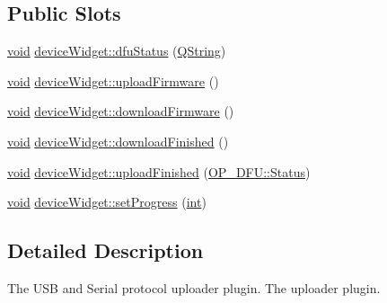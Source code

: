 \subsection*{Public Slots}
\begin{DoxyCompactItemize}
\item 
\hyperlink{group___u_a_v_objects_plugin_ga444cf2ff3f0ecbe028adce838d373f5c}{void} \hyperlink{group___uploader_gac421d53cac355c47f763a62eab7675c1}{device\-Widget\-::dfu\-Status} (\hyperlink{group___u_a_v_objects_plugin_gab9d252f49c333c94a72f97ce3105a32d}{Q\-String})
\item 
\hyperlink{group___u_a_v_objects_plugin_ga444cf2ff3f0ecbe028adce838d373f5c}{void} \hyperlink{group___uploader_ga51b53782cd70711b9ca91f81ef02565b}{device\-Widget\-::upload\-Firmware} ()
\item 
\hyperlink{group___u_a_v_objects_plugin_ga444cf2ff3f0ecbe028adce838d373f5c}{void} \hyperlink{group___uploader_ga988f01d143265ee96b4255b07b63fbf6}{device\-Widget\-::download\-Firmware} ()
\item 
\hyperlink{group___u_a_v_objects_plugin_ga444cf2ff3f0ecbe028adce838d373f5c}{void} \hyperlink{group___uploader_ga0809fb3c0a799a12c92704a36d3abf16}{device\-Widget\-::download\-Finished} ()
\item 
\hyperlink{group___u_a_v_objects_plugin_ga444cf2ff3f0ecbe028adce838d373f5c}{void} \hyperlink{group___uploader_ga671fb25fd918e7eeac5c16bd1f1dfe86}{device\-Widget\-::upload\-Finished} (\hyperlink{class_o_p___d_f_u_a83b075feaf572fe76e597acea58c8eda}{O\-P\-\_\-\-D\-F\-U\-::\-Status})
\item 
\hyperlink{group___u_a_v_objects_plugin_ga444cf2ff3f0ecbe028adce838d373f5c}{void} \hyperlink{group___uploader_ga8ac75c9483f273ed59faa116fe5699ee}{device\-Widget\-::set\-Progress} (\hyperlink{ioapi_8h_a787fa3cf048117ba7123753c1e74fcd6}{int})
\end{DoxyCompactItemize}


\subsection{Detailed Description}
The U\-S\-B and Serial protocol uploader plugin. The uploader plugin.

